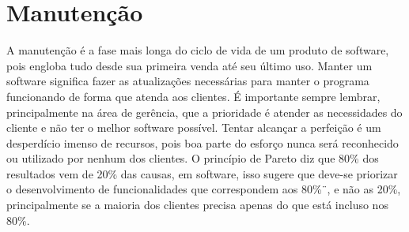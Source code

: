 \documentclass{article}
\begin{document}
\section{Manutenção}
A manutenção é a fase mais longa do ciclo de vida de um produto de software, pois engloba tudo desde sua primeira venda até seu último uso. Manter um software significa fazer as atualizações necessárias para manter o programa funcionando de forma que atenda aos clientes. É importante sempre lembrar, principalmente na área de gerência, que a prioridade é atender as necessidades do cliente e não ter o melhor software possível. Tentar alcançar a perfeição é um desperdício imenso de recursos, pois boa parte do esforço nunca será reconhecido ou utilizado por nenhum dos clientes. O princípio de Pareto diz que 80\% dos resultados vem de 20\% das causas, em software, isso sugere que deve-se priorizar o desenvolvimento de funcionalidades que correspondem aos 80\%¨, e não as 20\%, principalmente se a maioria dos clientes precisa apenas do que está incluso nos 80\%.
\end{document}

